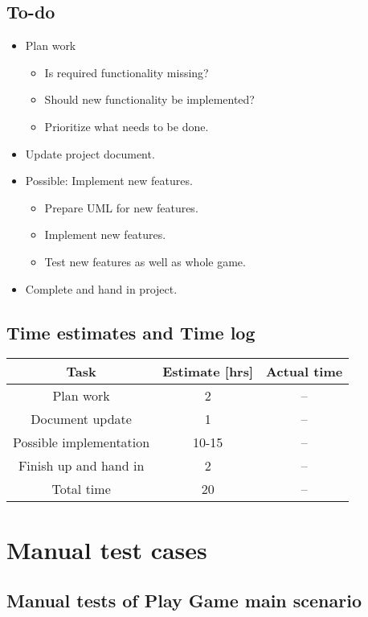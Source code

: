 \documentclass[12pt, letterpaper]{article}
\begin{document}
\subsection{To-do}
\begin{itemize}
	\item Plan work
	\begin{itemize}
		\item Is required functionality missing?
		\item Should new functionality be implemented?
		\item Prioritize what needs to be done.
	\end{itemize}
	\item Update project document.
	\item Possible: Implement new features.
	\begin{itemize}
		\item Prepare UML for new features.
		\item Implement new features.
		\item Test new features as well as whole game.
	\end{itemize}
	\item Complete and hand in project.
\end{itemize}
\subsection{Time estimates and Time log}
\begin{center}
	\begin{tabular}{|c|c|c|} 
		\hline
		Task & Estimate [hrs] & Actual time \\ [0.5ex] 
		\hline\hline
		Plan work & 2 & -- \\ 
		\hline
		Document update & 1 & --\\
		\hline 
		Possible implementation & 10-15 & -- \\ 
		\hline
		Finish up and hand in & 2 & --\\ 
		\hline 
		Total time & 20 & --\\ [1ex]
		\hline
		
	\end{tabular}
\end{center}
\newpage
\section{Manual test cases}
\subsection{Manual tests of Play Game main scenario}
\end{document}
